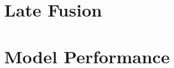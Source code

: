 \documentclass{erauthesis}
\begin{document}




\section{Late Fusion} \label{late_fusion}







\section{Model Performance} \label{performance}


\end{document}
